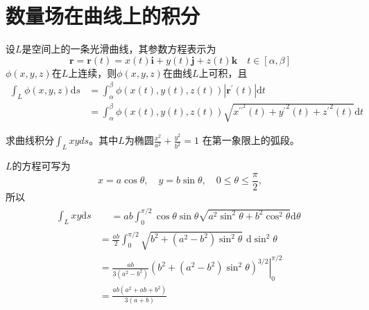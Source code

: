 \documentclass[lang=cn,10pt]{elegantbook}
\newcommand\bv[1]{\boldsymbol{#1}}
\begin{document}
\section{数量场在曲线上的积分}
\begin{theorem}
    设$L$是空间上的一条光滑曲线，其参数方程表示为
    \begin{equation}
        \bv{r}=\bv{r}(t)=x(t)\boldsymbol{i}+y(t)\boldsymbol{j}+z(t)\boldsymbol{k}\quad t\in[\alpha,\beta]
    \end{equation}
    $\phi(x,y,z)$在$L$上连续，则$\phi(x,y,z)$在曲线$L$上可积，且
    \begin{equation*}
        \begin{aligned}
            \int_{L}\phi(x,y,z)\mathrm{d}s
             & =\int_\alpha^\beta\phi(x(t),y(t),z(t))|\boldsymbol{r}^\prime(t)|\mathrm{d}t                                    \\
             & =\int_\alpha^\beta\phi(x(t),y(t),z(t))\sqrt{x^{\prime{'}^2}(t)+{y^{\prime}}^2(t)+{z^{\prime}}^2(t)}\mathrm{d}t
        \end{aligned}
    \end{equation*}
\end{theorem}

\begin{example}
    求曲线积分$\int_Lxyds$。其中$L$为椭圆$\frac{x^2}{a^2}+\frac{y^2}{b^2}=1$
    在第一象限上的弧段。
\end{example}
\begin{solution}
    $L$的方程可写为
    \begin{equation*}
        x=a\cos\theta,\quad y=b\sin\theta,\quad0\leqslant\theta\leqslant\frac\pi2,
    \end{equation*}
    所以
    \begin{equation*}
        \begin{aligned}
            \int_{L}xy\mathrm{d}s &
            \begin{aligned}
                 & =ab\int_0^{\pi/2}\cos\theta\sin\theta\sqrt{a^2\sin^2\theta+b^2\cos^2\theta}\mathrm{d}\theta
            \end{aligned}                    \\
                                  & =\frac{ab}2\int_0^{\pi/2}\sqrt{b^2+(a^2-b^2)\sin^2\theta}\text{ d}\sin^2\theta            \\
                                  & =\frac{ab}{3(a^2-b^2)}\left.\left(b^2+(a^2-b^2)\sin^2\theta\right)^{3/2}\right|_0^{\pi/2} \\
                                  & =\frac{ab(a^2+ab+b^2)}{3(a+b)}
        \end{aligned}
    \end{equation*}
\end{solution}
\end{document}
